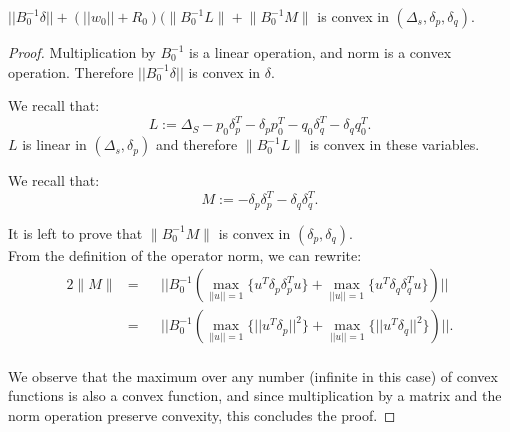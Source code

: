 \begin{lemma} \label{eq:GisConvex}
$||B_0^{-1}\delta|| + (||w_0||+R_0)(\Big \|B_0^{-1}L\Big \|+\Big \|B_0^{-1}M\Big \|$ is convex in $(\Delta_s,\delta_p, \delta_q).$
\end{lemma}
\begin{proof}
Multiplication by $B_0^{-1}$ is a linear operation, and norm is a convex
operation. Therefore $||B_0^{-1}\delta||$ is convex in $\delta$.

We recall that:
\begin{equation*}
L:= \Delta_S - p_0\delta_p^T - \delta_pp_0^T - q_0\delta_q^T - \delta_qq_0^T.
\end{equation*}
$L$ is linear in $(\Delta_s, \delta_p)$ and therefore $\Big \|B_0^{-1}L\Big \|$ is convex in these variables.


We recall that:
\begin{equation*}
M:= - \delta_p\delta_p^T - \delta_q\delta_q^T.
\end{equation*}

It is left to prove that $\Big \|B_0^{-1}M\Big \|$ is convex in $(\delta_p, \delta_q)$.
\\From the definition of the operator norm, we can rewrite:
\begin{alignat*} {2}
\Big \|M \Big \| & = && ||B_0^{-1}(\max_{||u||=1}{\{u^T \delta_p\delta_p^T u\}} +
\max_{||u||=1}{\{u^T \delta_q\delta_q^T u\}})||\\
& = && ||B_0^{-1}(\max_{||u||=1}{\{||u^T \delta_p||^2\}} +
\max_{||u||=1}{\{||u^T \delta_q||^2\}})||.
\end{alignat*}
\\We observe that the maximum over any number (infinite in this case) of convex functions
 is also a convex
function, and since multiplication by a matrix and the norm
operation preserve convexity, this concludes the proof.
\end{proof}


